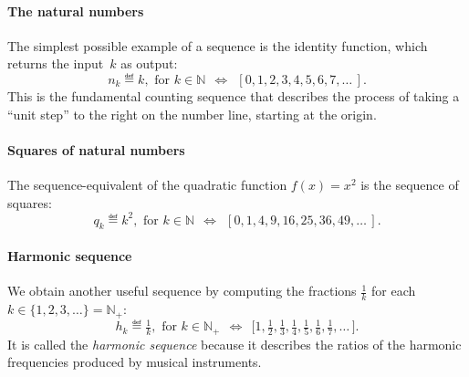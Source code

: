 		\paragraph{The natural numbers}

			The simplest possible example of a sequence is the identity function,
			which returns the input~$k$ as output:
			\[
				n_k\eqdef k, \text{ for } k \in \mathbb{N}
				  \ \ \Leftrightarrow \ \ 
				  \left[0, 1, 2, 3, 4, 5, 6, 7, \ldots \, \right].
			\]
			This is the fundamental counting sequence that describes
			the process of taking a ``unit step'' to the right on the number line,
			starting at the origin.


		\paragraph{Squares of natural numbers}

			The sequence-equivalent of the quadratic function $f(x)=x^2$
			is the sequence of squares:
			\[
				q_k\eqdef k^2, \text{ for } k \in \mathbb{N}
				  \ \ \Leftrightarrow \ \ 
				  \left[0, 1, 4, 9, 16, 25, 36, 49, \ldots \, \right].
			\]


		\paragraph{Harmonic sequence}

			We obtain another useful sequence by computing the fractions $\frac{1}{k}$
			for each $k \in \{1,2,3,\ldots\} = \mathbb{N}_+$:
			\[
				h_k\eqdef \tfrac{1}{k}, \text{ for } k \in \mathbb{N}_+
				  \ \ \Leftrightarrow \ \ 
				  \big[1, \tfrac{1}{2}, \tfrac{1}{3}, \tfrac{1}{4}, \tfrac{1}{5}, \tfrac{1}{6}, \tfrac{1}{7}, \ldots \, \big].
			\]
			It is called the \emph{harmonic sequence}
			because it describes the ratios of the harmonic frequencies produced by musical instruments.


